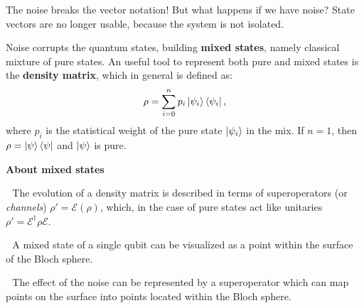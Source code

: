 \documentclass[aspectratio=169, 8pt, xcolor={svgnames}, hyperref={linkcolor=black}]{beamer}
\begin{document}
\begin{frame}{The noise breaks the vector notation!}
\textcolor{carnelian}{But what happens if we have noise?} \pause State vectors 
are no longer usable, because the system is not isolated. \pause

Noise corrupts the quantum states, building \textbf{mixed states}, namely classical 
mixture of pure states. \pause An useful tool to represent both pure and mixed states is the \textbf{density matrix}, 
which in general is defined as:
$$ \rho = \sum_{i=0}^n p_i \ket{\psi_i}\bra{\psi_i}, $$
where $p_i$ is the statistical weight of the pure state $\ket{\psi_i}$ in the mix. 
If $n=1$, then $\rho=\ket{\psi}\bra{\psi}$ and $\ket{\psi}$ is pure. \pause

\begin{multicols}{2}
\textbf{About mixed states}

{\footnotesize\faCircle\,\,} The evolution of a density matrix is described in terms 
of superoperators (or \textit{channels}) $\rho' = \mathcal{E} (\rho)$, which, in the case of pure states 
act like unitaries $ \rho' = \mathcal{E}^{\dagger} \rho \mathcal{E}. $ 

{\footnotesize\faCircle\,\,} A mixed state of a single qubit can be visualized as a point within the surface
of the Bloch sphere. 

{\footnotesize\faCircle\,\,} The effect of the noise can be represented by a superoperator
which can map points on the surface into points located within the Bloch sphere.     
\begin{center}
\end{center}
\end{multicols}
\end{frame}
\end{document}
